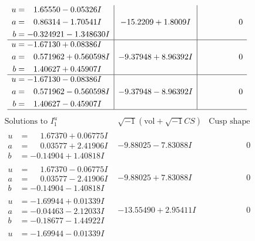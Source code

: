 \documentclass[1p]{elsarticle_modified}
\theoremstyle{definition}
\newcommand{\I}{\sqrt{-1}}
\begin{document}
$$\begin{array}{c|c|c}
\begin{aligned}
u &= \phantom{-}1.65550 - 0.05326 I \\
a &= \phantom{-}0.86314 - 1.70541 I \\
b &= -0.324921 - 1.348630 I\end{aligned}
 & -15.2209 + 1.8009 I & \phantom{-0.000000 } 0 \\ \hline\begin{aligned}
u &= -1.67130 + 0.08386 I \\
a &= \phantom{-}0.571962 + 0.560598 I \\
b &= \phantom{-}1.40627 + 0.45907 I\end{aligned}
 & -9.37948 + 8.96392 I & \phantom{-0.000000 } 0 \\ \hline\begin{aligned}
u &= -1.67130 - 0.08386 I \\
a &= \phantom{-}0.571962 - 0.560598 I \\
b &= \phantom{-}1.40627 - 0.45907 I\end{aligned}
 & -9.37948 - 8.96392 I & \phantom{-0.000000 } 0\\
 \hline 
 \end{array}$$\newpage$$\begin{array}{c|c|c}  
\text{Solutions to }I^u_{1}& \I (\text{vol} + \sqrt{-1}CS) & \text{Cusp shape}\\
 \hline 
\begin{aligned}
u &= \phantom{-}1.67370 + 0.06775 I \\
a &= \phantom{-}0.03577 + 2.41906 I \\
b &= -0.14904 + 1.40818 I\end{aligned}
 & -9.88025 - 7.83088 I & \phantom{-0.000000 } 0 \\ \hline\begin{aligned}
u &= \phantom{-}1.67370 - 0.06775 I \\
a &= \phantom{-}0.03577 - 2.41906 I \\
b &= -0.14904 - 1.40818 I\end{aligned}
 & -9.88025 + 7.83088 I & \phantom{-0.000000 } 0 \\ \hline\begin{aligned}
u &= -1.69944 + 0.01339 I \\
a &= -0.04463 - 2.12033 I \\
b &= -0.18677 - 1.44922 I\end{aligned}
 & -13.55490 + 2.95411 I & \phantom{-0.000000 } 0 \\ \hline\begin{aligned}
u &= -1.69944 - 0.01339 I \\

\end{aligned}
\end{array}$$
\end{document}
